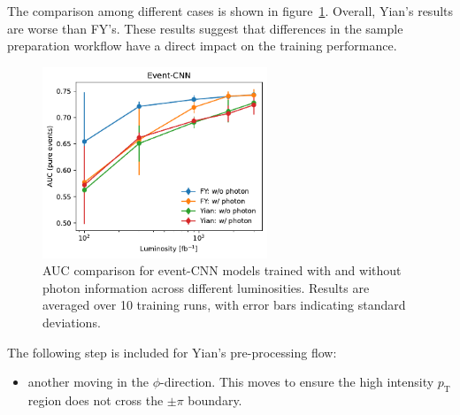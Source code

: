 \documentclass[12pt]{article}
\begin{document}
    The comparison among different cases is shown in figure~\ref{fig:eventCNN_AUC_various_L_yian_FY}. Overall, Yian's results are worse than FY's. These results suggest that differences in the sample preparation workflow have a direct impact on the training performance.  
    \begin{figure}[htpb]
        \centering
        \includegraphics[width=0.60\textwidth]{event_CNN_AUC-true_L_yian_FY.pdf}
        \caption{AUC comparison for event-CNN models trained with and without photon information across different luminosities. Results are averaged over 10 training runs, with error bars indicating standard deviations.}
        \label{fig:eventCNN_AUC_various_L_yian_FY}
    \end{figure}

    The following step is included for Yian's pre-processing flow:
    \begin{itemize}
        \item another moving in the $\phi$-direction. This moves to ensure the high intensity $p_{\text{T}}$ region does not cross the $\pm\pi$ boundary.
    \end{itemize}
\end{document}
